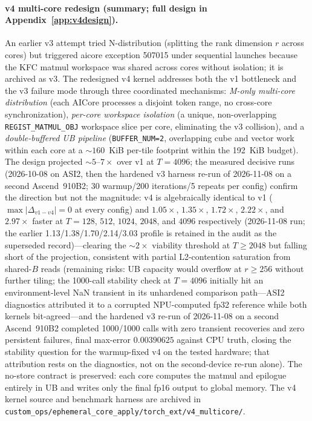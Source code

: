 \paragraph{v4 multi-core redesign (summary; full design in
Appendix~\ref{app:v4design}).}
An earlier v3 attempt tried N-distribution (splitting the rank dimension
$r$ across cores) but triggered aicore exception 507015 under sequential
launches because the KFC matmul workspace was shared across cores without
isolation; it is archived as v3.  The redesigned v4 kernel addresses both
the v1 bottleneck and the v3 failure mode through three coordinated
mechanisms: \emph{M-only multi-core distribution} (each AICore processes a
disjoint token range, no cross-core synchronization), \emph{per-core
workspace isolation} (a unique, non-overlapping
\texttt{REGIST\_MATMUL\_OBJ} workspace slice per core, eliminating the v3
collision), and a \emph{double-buffered UB pipeline}
(\texttt{BUFFER\_NUM=2}, overlapping cube and vector work within each core
at a ${\sim}160$~KiB per-tile footprint within the 192~KiB budget).  The
design projected ${\sim}5$--$7\times$ over v1 at $T{=}4096$; the measured
decisive runs (2026-10-08 on ASI2, then the hardened v3 harness re-run of
2026-11-08 on a second Ascend~910B2; 30 warmup/200 iterations/5 repeats
per config) confirm the
direction but not the magnitude: v4 is algebraically identical to v1
($\max|\Delta_{v1-v4}|=0$ at every config) and $1.05\times$, $1.35\times$,
$1.72\times$, $2.22\times$, and $2.97\times$ faster at $T{=}128$, $512$,
$1024$, $2048$, and $4096$ respectively (2026-11-08 run; the earlier
1.13/1.38/1.70/2.14/3.03 profile is retained in the audit as the
superseded record)---clearing the ${\sim}2\times$
viability threshold at $T\ge2048$ but falling short of the projection,
consistent with partial L2-contention saturation from shared-$B$ reads
(remaining risks: UB capacity would overflow at $r\ge256$ without further
tiling; the 1000-call stability check at $T{=}4096$ initially hit an
environment-level NaN transient in its unhardened comparison path---ASI2
diagnostics attributed it to a corrupted NPU-computed fp32 reference while
both kernels bit-agreed---and the hardened v3 re-run of 2026-11-08 on a
second Ascend~910B2 completed 1000/1000 calls with zero transient
recoveries and zero persistent failures, final max-error $0.00390625$
against CPU truth, closing the stability question for the warmup-fixed v4
on the tested hardware; that attribution rests on the diagnostics, not on
the second-device re-run alone).
The no-store contract is preserved: each core computes the matmul and
epilogue entirely in UB and writes only the final fp16 output to global
memory.  The v4 kernel source and benchmark harness are archived in
\texttt{custom\_ops/ephemeral\_core\_apply/torch\_ext/v4\_multicore/}.

